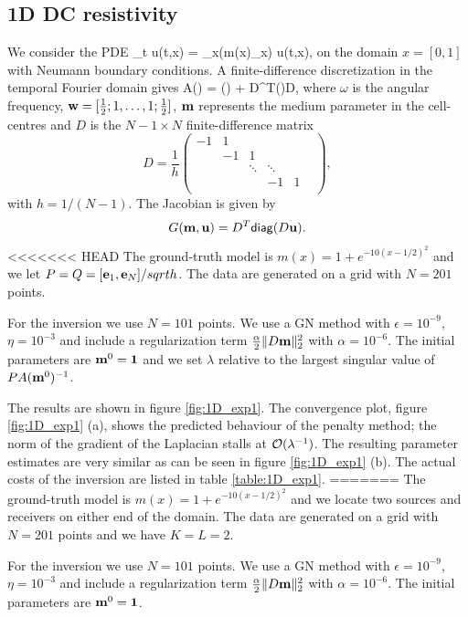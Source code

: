 \documentclass{iopart}
\begin{document}
{\subsection{1D DC resistivity}
We consider the PDE
\bq
\partial_t u(t,x) = \partial_x\left(m(x)\partial_x\right) u(t,x),
\eq
on the domain $x = [0,1]$ with Neumann boundary conditions. 
A finite-difference discretization in the temporal Fourier domain gives
\bq
A() = \imath\omega{}() + D^T()D,
\eq
where $\omega$ is the angular frequency, $\mathbf{w} = [\frac{1}{2}; 1, \ldots, 1; \frac{1}{2}]$, $\mathbf{m}$ represents 
the medium parameter in the cell-centres and $D$ is the $N-1\times N$ finite-difference matrix
\[
D=\frac{1}{h}\left(\begin{array}{cccccc} 
-1& 1&   &  &      &   \\
  &-1& 1 &  &      &   \\
  &  &\ddots&\ddots&   \\
  &  &      & -1   & 1 \\
\end{array}\right),
\]
with $h=1/(N-1)$. The Jacobian is given by 
\[
G(\mathbf{m},\mathbf{u}) = D^T\mathsf{diag}(D\mathbf{u}).
\]
<<<<<<< HEAD
The ground-truth model is $m(x) = 1+e^{-10(x-1/2)^2}$ and we let $P = Q = [\mathbf{e}_1, \mathbf{e}_{N}]/sqrt{h}$. 
The data are generated on a grid with $N=201$ points.

For the inversion we use $N=101$ points.
We use a GN method with $\epsilon=10^{-9}$, $\eta=10^{-3}$ and include a regularization term $\frac{\alpha}{2} \|D\mathbf{m}\|_2^2$ with $\alpha = 10^{-6}$.
The initial parameters are $\mathbf{m}^0 = \mathbf{1}$ and we set $\lambda$ relative to the largest singular value of $PA(\mathbf{m}^0)^{-1}$.

The results are shown in figure \ref{fig:1D_exp1}. The convergence plot, figure \ref{fig:1D_exp1} (a), shows the predicted behaviour of the penalty method; the norm
of the gradient of the Laplacian stalls at $\mathcal{O}(\lambda^{-1})$. The resulting parameter estimates are very similar as can be seen 
in figure \ref{fig:1D_exp1} (b). The actual costs of the inversion are listed in table \ref{table:1D_exp1}.
=======
The ground-truth model is $m(x) = 1+e^{-10(x-1/2)^2}$ and we locate two sources and receivers on either end of the domain. The data are generated on a grid with $N=201$ points and we have $K=L=2$.

For the inversion we use $N=101$ points.
We use a GN method with $\epsilon=10^{-9}$, $\eta=10^{-3}$ and include a regularization term $\frac{\alpha}{2} \|D\mathbf{m}\|_2^2$ with $\alpha = 10^{-6}$.
The initial parameters are $\mathbf{m}^0 = \mathbf{1}$.

}
\end{document}
